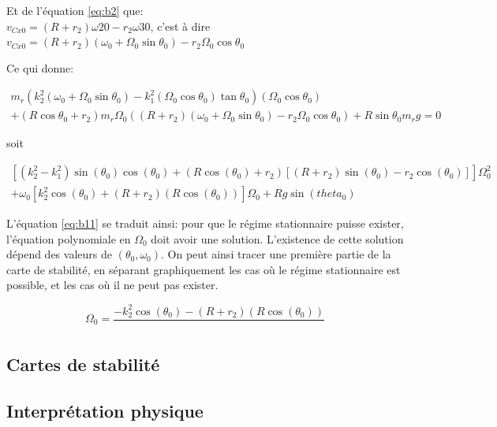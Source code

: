 Et de l'équation \ref{eq:b2} que:\\
$v_{Cx0}=(R+r_2)\omega{20}-r_2\omega{30}$, c'est à dire $v_{Cx0}=(R+r_2)(\omega_0 + \Omega_0 \sin{\theta_0})-r_2\Omega_0 \cos{\theta_0}$

Ce qui donne:

\begin{equation}
 \begin{split}
     m_r(k_2^2(\omega_0 + \Omega_0 \sin{\theta_0})-k_1^2(\Omega_0 \cos{\theta_0}) \tan{\theta_0})(\Omega_0 \cos{\theta_0})\\
    +(R\cos{\theta_0}+r_2)m_r \Omega_0 ((R+r_2)(\omega_0 + \Omega_0 \sin{\theta_0})-r_2\Omega_0 \cos{\theta_0}) + R\sin{\theta_0}m_r g =0
 \end{split}
  \label{eq:b11}
\end{equation}

soit

\begin{equation}
 \begin{split}
     [(k_2^2-k_1^2)\sin(\theta_0)\cos(\theta_0)+(R \cos(\theta_0)+r_2)[(R+r_2)\sin(\theta_0)-r_2 \cos(\theta_0)]]\Omega_0^2 \\
     +\omega_0[k_2^2 \cos(\theta_0)+(R+r_2)(R \cos(\theta_0))] \Omega_0 + Rg \sin(theta_0)
 \end{split}
  \label{eq:b12}
\end{equation}

L'équation \ref{eq:b11} se traduit ainsi: pour que le régime stationnaire puisse exister, l'équation polynomiale en $\Omega_0$ doit avoir une solution. L'existence de cette solution dépend des valeurs de $(\theta_0,\omega_0)$. On peut ainsi tracer une première partie de la carte de stabilité, en séparant graphiquement les cas où le régime stationnaire est possible, et les cas où il ne peut pas exister.

\begin{equation}
 \Omega_0=\frac{-k_2^2 \cos(\theta_0)-(R+r_2)(R \cos(\theta_0)) }{}
  \label{eq:b13}
\end{equation}



\subsection{Cartes de stabilité}

\subsection{Interprétation physique}








































